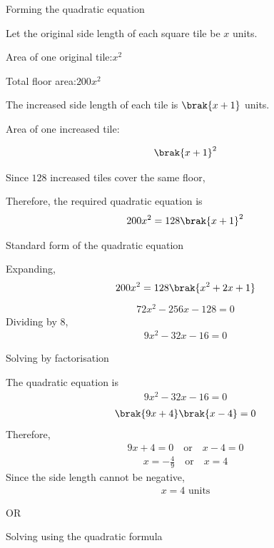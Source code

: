 \begin{enumerate}[label=\thesubsection.\arabic*, ref=\thesubsection.\theenumi]
 Forming the quadratic equation

Let the original side length of each square tile be \(x\) units.

Area of one original tile:$x^2$

Total floor area:$200x^2$

The increased side length of each tile is \(\brak{x+1}\) units.

Area of one increased tile:

\begin{align}
\brak{x+1}^2
\end{align}

Since \(128\) increased tiles cover the same floor,

Therefore, the required quadratic equation is
\begin{align}
200x^2=128\brak{x+1}^2
\end{align}

 Standard form of the quadratic equation

Expanding,
\begin{align}
200x^2=128\brak{x^2+2x+1}
\end{align}
\begin{align}
72x^2-256x-128=0
\end{align}
Dividing by \(8\),
\begin{align}
9x^2-32x-16=0
\end{align}

  Solving by factorisation

The quadratic equation is
\begin{align}
9x^2-32x-16=0
\end{align}
\begin{align}
\brak{9x+4}\brak{x-4}=0
\end{align}
Therefore,
\begin{align}
9x+4=0 \quad \text{or} \quad x-4=0
\end{align}
\begin{align}
x=-\frac{4}{9} \quad \text{or} \quad x=4
\end{align}
Since the side length cannot be negative,
\begin{align}
x=4\text{ units}
\end{align}

OR

  Solving using the quadratic formula


\end{enumerate}
